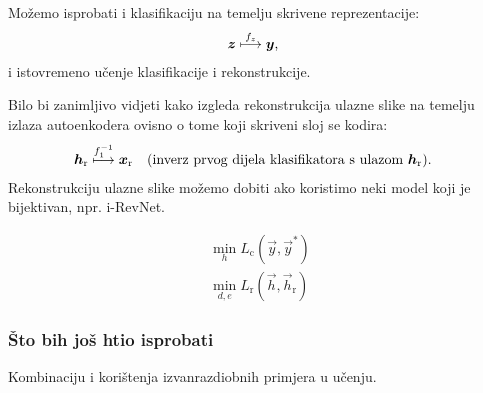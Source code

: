 \documentclass{article}
\begin{document}
Možemo isprobati i klasifikaciju na temelju skrivene reprezentacije:
\begin{align}
    &\vec z \overset{f_z}{\longmapsto} \vec y \text,
\end{align}
i istovremeno učenje klasifikacije i rekonstrukcije.

Bilo bi zanimljivo vidjeti kako izgleda rekonstrukcija ulazne slike na temelju izlaza autoenkodera ovisno o tome koji skriveni sloj se kodira:
\begin{align}
    &\vec h_\text{r} \overset{f_1^{-1}}{\longmapsto} \vec x_\text{r}
    \quad \text{(inverz prvog dijela klasifikatora s ulazom $\vec h_\text{r}$)} \text.
\end{align}
Rekonstrukciju ulazne slike možemo dobiti ako koristimo neki model koji je bijektivan, npr. i-RevNet.


\begin{align}
    \min_{h} L_\text{c}(\vec y, \vec y^*) \\
    \min_{d, e} L_\text{r}(\vec h,\vec h_\text{r})
\end{align}

\subsubsection{Što bih još htio isprobati}

Kombinaciju \cite{Lee:2017:TCCCDOOD} i korištenja izvanrazdiobnih primjera u učenju.


 
%
\end{document}
